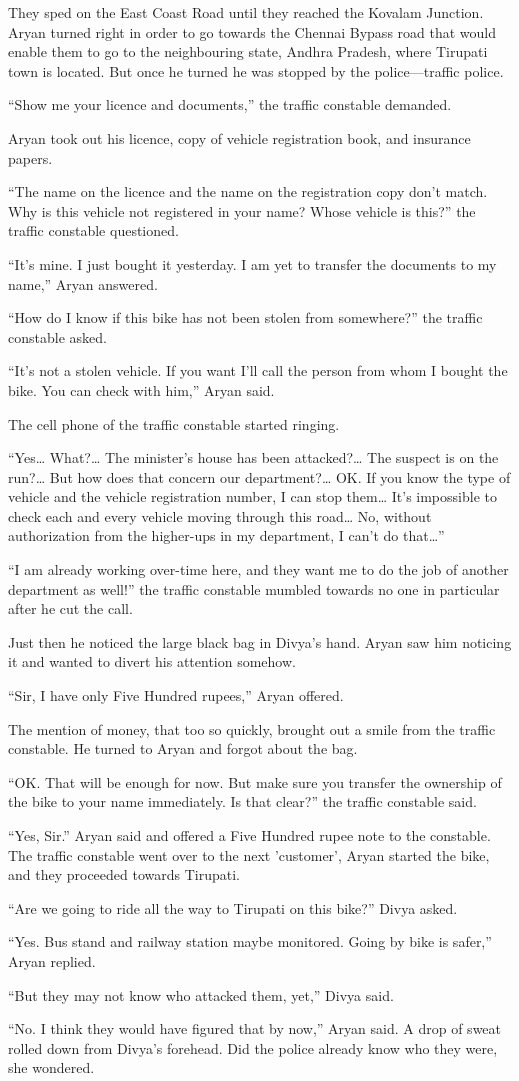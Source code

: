 They sped on the East Coast Road until they reached the Kovalam Junction. Aryan
turned right in order to go towards the Chennai Bypass road that would enable
them to go to the neighbouring state, Andhra Pradesh, where Tirupati town is
located. But once he turned he was stopped by the police—traffic police.

“Show me your licence and documents,” the traffic constable demanded.

Aryan took out his licence, copy of vehicle registration book, and insurance
papers.

“The name on the licence and the name on the registration copy don't match. Why
is this vehicle not registered in your name? Whose vehicle is this?” the traffic
constable questioned.

“It's mine. I just bought it yesterday. I am yet to transfer the documents to my
name,” Aryan answered.

“How do I know if this bike has not been stolen from somewhere?” the traffic
constable asked.

“It's not a stolen vehicle. If you want I'll call the person from whom I bought
the bike. You can check with him,” Aryan said.

The cell phone of the traffic constable started ringing.

“Yes… What?… The minister's house has been attacked?… The suspect is on
the run?… But how does that concern our department?… OK. If you know the
type of vehicle and the vehicle registration number, I can stop them… It's
impossible to check each and every vehicle moving through this road… No,
without authorization from the higher-ups in my department, I can't do that…”

“I am already working over-time here, and they want me to do the job of another
department as well!” the traffic constable mumbled towards no one in particular
after he cut the call.

Just then he noticed the large black bag in Divya's hand. Aryan saw him noticing
it and wanted to divert his attention somehow.

“Sir, I have only Five Hundred rupees,” Aryan offered.

The mention of money, that too so quickly, brought out a smile from the traffic
constable. He turned to Aryan and forgot about the bag.

“OK. That will be enough for now. But make sure you transfer the ownership of
the bike to your name immediately. Is that clear?” the traffic constable said.

“Yes, Sir.” Aryan said and offered a Five Hundred rupee note to the constable.
The traffic constable went over to the next 'customer', Aryan started the bike,
and they proceeded towards Tirupati.

“Are we going to ride all the way to Tirupati on this bike?” Divya asked.

“Yes. Bus stand and railway station maybe monitored. Going by bike is safer,”
Aryan replied.

“But they may not know who attacked them, yet,” Divya said.

“No. I think they would have figured that by now,” Aryan said. A drop of sweat
rolled down from Divya's forehead. Did the police already know who they were,
she wondered.